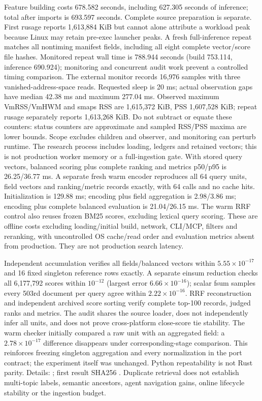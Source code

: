 \documentclass[11pt]{article}
\begin{document}
Feature building costs 678.582 seconds, including 627.305 seconds of inference;
total after imports is 693.597 seconds. Complete source preparation is separate.
First rusage reports 1,613,884 KiB but cannot alone attribute a workload peak
because Linux may retain pre-exec launcher peaks. A fresh full-inference repeat
matches all nontiming manifest fields, including all eight complete vector/score
file hashes. Monitored repeat wall time is 788.944 seconds (build 753.114,
inference 690.924); monitoring and concurrent audit work prevent a controlled
timing comparison. The external monitor records 16,976 samples with three
vanished-address-space reads. Requested sleep is 20 ms; actual observation gaps
have median 42.38 ms and maximum 277.04 ms. Observed maximum VmRSS/VmHWM and
smaps RSS are 1,615,372 KiB, PSS 1,607,528 KiB; repeat rusage separately reports
1,613,268 KiB. Do not subtract or equate these counters: status counters are
approximate and sampled RSS/PSS maxima are lower bounds. Scope excludes children
and observer, and monitoring can perturb runtime. The research process includes
loading, ledgers and retained vectors; this is not production worker memory
or a full-ingestion gate.
With stored query vectors, balanced scoring plus complete ranking and metrics
p50/p95 is 26.25/36.77 ms. A separate fresh warm encoder reproduces all 64
query units, field vectors and ranking/metric records exactly, with 64 calls
and no cache hits. Initialization is 129.88 ms; encoding plus field aggregation
is 2.98/3.86 ms; encoding plus complete balanced evaluation is 21.04/26.15 ms.
The warm RRF control also reuses frozen BM25 scores, excluding lexical query
scoring. These are offline costs excluding loading/initial build, network, CLI/MCP,
filters and reranking, with uncontrolled OS cache/read order and evaluation
metrics absent from production. They are not production search latency.

Independent accumulation verifies all fields/balanced vectors within
$5.55\times10^{-17}$ and 16 fixed singleton reference rows exactly. A separate
einsum reduction checks all 6,177,792 scores within $10^{-12}$ (largest error
$6.66\times10^{-16}$); scalar fsum samples every 503rd document per query
agree within $2.22\times10^{-16}$. RRF reconstruction and independent archived
score sorting verify complete top-100 records, judged ranks and metrics.
The audit shares the source loader, does not independently infer all units,
and does not prove cross-platform close-score tie stability. The warm checker
initially compared a raw unit with an aggregated field: a $2.78\times10^{-17}$
difference disappears under corresponding-stage comparison. This reinforces
freezing singleton aggregation and every normalization in the port contract;
the experiment itself was unchanged. Python repeatability is not Rust parity.
Details: ; first result
SHA256 .
Duplicate retrieval does not establish multi-topic labels, semantic ancestors,
agent navigation gains, online lifecycle stability or the ingestion budget.
\end{document}
